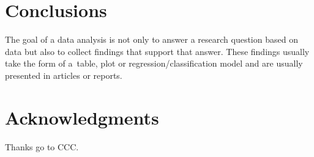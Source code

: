 \documentclass[nojss]{jss}\usepackage[]{graphicx}\usepackage[]{color}
\begin{document}
\section{Conclusions}
\label{sec:conc4}

The goal of a data analysis is not only to answer a research question based on data but also to collect findings that support that answer. These findings usually take the form of a~table, plot or regression/classification model and are usually presented in articles or reports.

\section{Acknowledgments}

Thanks go to CCC.

%

\end{document}
